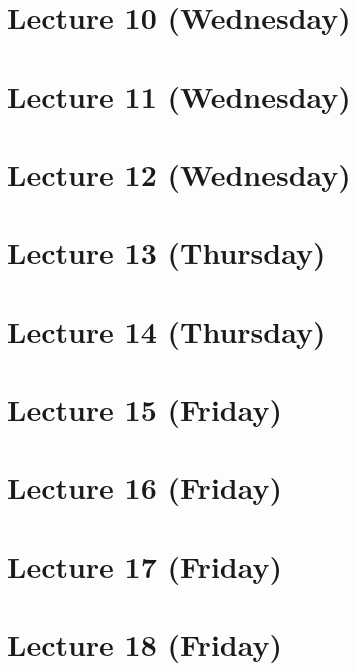 \documentclass[12pt]{amsart}
\begin{document}
\section{Lecture 10 (Wednesday)}


\section{Lecture 11 (Wednesday)}


\section{Lecture 12 (Wednesday)}


\section{Lecture 13 (Thursday)}


\section{Lecture 14 (Thursday)}


\section{Lecture 15 (Friday)}
% 

\section{Lecture 16 (Friday)}
% 

\section{Lecture 17 (Friday)}
% 

\section{Lecture 18 (Friday)}
% 
\end{document}
